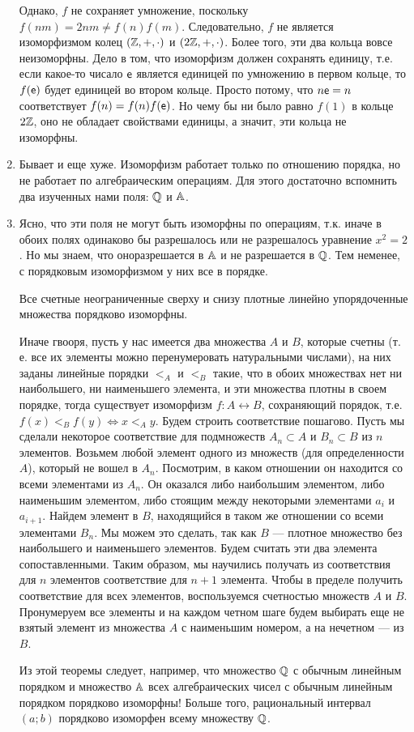 \begin{enumerate}
Однако, $f$ не сохраняет умножение, поскольку $f(nm)=2nm\ne f(n)f(m)$. Следовательно, $f$ не является изоморфизмом колец $(\mathbb Z,+,\cdot)$ и $(2\mathbb Z,+,\cdot)$. Более того, эти два кольца вовсе неизоморфны. Дело в том, что изоморфизм должен сохранять единицу, т.е. если какое-то чисало $\mathsf e$ является единицей по умножению в первом кольце, то $f(\mathsf e)$ будет единицей во втором кольце. Просто потому, что $n\mathsf e=n$ соответствует $f(n)=f(n)f(\mathsf e)$. Но чему бы ни было равно $f(1)$ в кольце $2\mathbb Z$, оно не обладает свойствами единицы, а значит, эти кольца не изоморфны.
\item Бывает и еще хуже. Изоморфизм работает только по отношению порядка, но не работает по алгебраическим операциям. Для этого достаточно вспомнить два изученных нами поля: $\mathbb Q$ и $\mathbb A$.
\item Ясно, что эти поля не могут быть изоморфны по операциям, т.к. иначе в обоих полях одинаково бы разрешалось или не разрешалось уравнение $x^2=2$. Но мы знаем, что оноразрешается в $\mathbb A$ и не разрешается в $\mathbb Q$. Тем неменее, с порядковым изоморфизмом у них все в порядке.
\begin{thrm} Все счетные неограниченные сверху и снизу плотные линейно упорядоченные множества порядково изоморфны.\end{thrm}
Иначе гвооря, пусть у нас имеется два множества $A$ и $B$, которые счетны (т.\,е. все их элементы можно перенумеровать натуральными числами), на них заданы линейные порядки $<_A$ и $<_B$ такие, что в обоих множествах нет ни наибольшего, ни наименьшего элемента, и эти множества плотны в своем порядке, тогда существует изоморфизм $f:A\leftrightarrow B$, сохраняющий порядок, т.е. $f(x)<_Bf(y)\Leftrightarrow x<_Ay$.
\pf
Будем строить соответствие пошагово. Пусть мы сделали некоторое соответствие для подмножеств $A_n\subset A$ и $B_n\subset B$ из $n$ элементов. Возьмем любой элемент одного из множеств (для определенности $A$), который не вошел в $A_n$. Посмотрим, в каком отношении он находится со всеми элементами из $A_n$. Он оказался либо наибольшим элементом, либо наименьшим элементом, либо стоящим между некоторыми элементами $a_i$ и $a_{i+1}$. Найдем элемент в $B$, находящийся в таком же отношении со всеми элементами $B_n$. Мы можем это сделать, так как $B$ --- плотное множество без наибольшего и наименьшего элементов. Будем считать эти два элемента сопоставленными. Таким образом, мы научились получать из соответствия для $n$ элементов соответствие для $n+1$ элемента. Чтобы в пределе получить соответствие для всех элементов, воспользуемся счетностью множеств $A$ и $B$. Пронумеруем все элементы и на каждом четном шаге будем выбирать еще не взятый элемент из множества $A$ с наименьшим номером, а на нечетном --- из $B$.
\epf

Из этой теоремы следует, например, что множество $\mathbb Q$ с обычным линейным порядком и множество $\mathbb A$ всех алгебраических чисел с обычным линейным порядком порядково изоморфны! Больше того, рациональный интервал $(a;b)$ порядково изоморфен всему множеству  $\mathbb Q$.
\end{enumerate}



